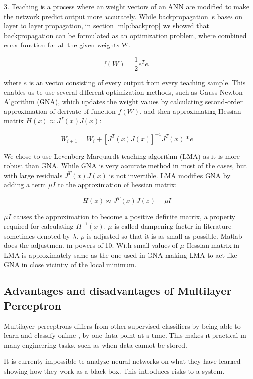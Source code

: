 3. Teaching is a process where an weight vectors of an ANN are modified to make the network predict output more accurately. While backpropagation is bases on layer to layer propagation, in section \ref{mlp:backprop}  we showed that backpropagation can be formulated as an optimization problem, where combined error function for all the given weights W:

\[f(W) = \frac{1}{2} e^Te,\]

where $e$ is an vector consisting of every output from every teaching sample. This enables us to use several different optimization methods, such as  Gauss-Newton Algorithm (GNA), which updates the weight values by calculating second-order approximation of derivate of function $f(W)$, and then approximating Hessian matrix $H(x) \approx J^T(x)J(x)$:

\[ W_{i+1} = W_i +  [J^T(x)J(x)]^{-1}J^T(x) * e \]

We chose to use Levenberg-Marquardt teaching algorithm (LMA) as it is more robust than GNA. While GNA is very accurate method in most of the cases, but with large residuals $J^T(x)J(x)$ is not invertible. LMA modifies GNA by adding a term $\mu I$ to the approximation of hessian matrix:

\[ H(x) \approx J^T(x)J(x) + \mu I \]

$\mu I$ causes the approximation to become a positive definite matrix, a property required for calculating $H^{-1}(x)$. $\mu$ is  called dampening factor in literature, sometimes denoted by $\lambda$. $\mu$ is adjusted so that it is as small as possible. Matlab does the adjustment in powers of 10. With small values of $\mu$ Hessian matrix in LMA is approximately same as  the one used in GNA making LMA to act like GNA in close vicinity of the local minimum.


\subsection{Advantages and disadvantages of Multilayer Perceptron}

Multilayer perceptrons differs from other supervised classifiers by being able to learn and classify online \cite{wiki:onlinealgorithm} ,  by one data point at a time. This makes it practical in many engineering tasks, such as when data cannot be stored.

It is currenty impossible to analyze neural networks on what they have learned showing how they work as a black box. This introduces risks to a system.


